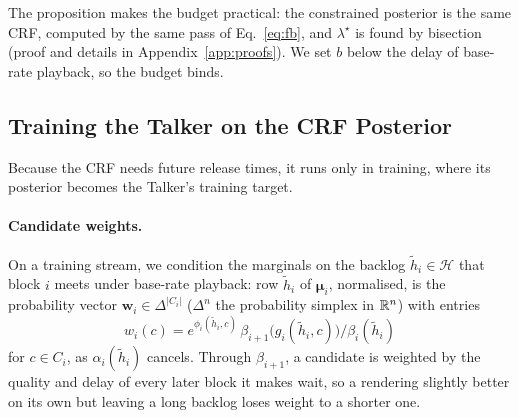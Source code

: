\noindent The proposition makes the budget practical: the constrained posterior is the same CRF, computed by the same
pass of Eq.~\eqref{eq:fb}, and $\lambda^\star$ is found by bisection (proof and details in Appendix~\ref{app:proofs}).
We set $b$ below the delay of base-rate playback, so the budget binds.

\subsection{Training the Talker on the CRF Posterior}
\label{sec:method-train}

Because the CRF needs future release times, it runs only in training, where its posterior becomes the Talker's
training target.

\paragraph{Candidate weights.} On a training stream, we condition the marginals on the backlog $\tilde h_i\in\mathcal{H}$
that block $i$ meets under base-rate playback: row $\tilde h_i$ of $\bm{\mu}_i$, normalised, is the probability vector
$\bm{w}_i\in\Delta^{|C_i|}$ ($\Delta^n$ the probability simplex in $\mathbb{R}^n$) with entries
\begin{equation}
w_i(c)=e^{\phi_i(\tilde h_i,c)}\,\beta_{i+1}\big(g_i(\tilde h_i,c)\big)\big/\beta_i(\tilde h_i)
\label{eq:w}
\end{equation}
for $c\in C_i$, as $\alpha_i(\tilde h_i)$ cancels. Through $\beta_{i+1}$, a candidate is weighted by the quality and delay of every later
block it makes wait, so a rendering slightly better on its own but leaving a long backlog loses weight to a shorter one.

